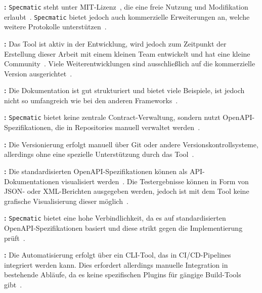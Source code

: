 \textbf{:} \texttt{Specmatic} steht unter \gls{MIT}-Lizenz~\cite{ZnsioSpecmatic2025}, die eine freie Nutzung und Modifikation erlaubt~\cite{MITLicense}.
\texttt{Specmatic} bietet jedoch auch kommerzielle Erweiterungen an, welche \zB weitere Protokolle unterstützen~\cite{ContractDrivenDevelopment}.

\textbf{:} Das Tool ist aktiv in der Entwicklung, wird jedoch zum Zeitpunkt der Erstellung dieser Arbeit mit einem kleinen Team entwickelt und hat eine kleine Community~\cite{ZnsioSpecmatic2025}.
Viele Weiterentwicklungen sind ausschließlich auf die kommerzielle Version ausgerichtet~\cite{ContractDrivenDevelopment}.

\textbf{:} Die Dokumentation ist gut strukturiert und bietet viele Beispiele, ist jedoch nicht so umfangreich wie bei den anderen Frameworks~\cite{SpecmaticDocumentationContract}.

\textbf{:} \texttt{Specmatic} bietet keine zentrale Contract-Verwaltung, sondern nutzt \gls{OpenAPI}-Spezifikationen, die in Repositories manuell verwaltet werden~\cite{ContractDrivenDevelopment}.

\textbf{:} Die Versionierung erfolgt manuell über Git oder andere Versionskontrollsysteme, allerdings ohne eine spezielle Unterstützung durch das Tool~\cite{SpecmaticDocumentationContract}.

\textbf{:} Die standardisierten \gls{OpenAPI}-Spezifikationen können als \gls{API}-Dokumentationen visualisiert werden~\cite{OpenAPIDocumentation}.
Die Testergebnisse können in Form von \gls{JSON}- oder \gls{XML}-Berichten ausgegeben werden, jedoch ist mit dem Tool keine grafische Visualisierung dieser möglich~\cite{SpecmaticDocumentationContract}.

\textbf{:} \texttt{Specmatic} bietet eine hohe Verbindlichkeit, da es auf standardisierten \gls{OpenAPI}-Spezifikationen basiert und diese strikt gegen die Implementierung prüft~\cite{SpecmaticDocumentationContract}.

\textbf{:} Die Automatisierung erfolgt über ein \gls{CLI}-Tool, das in \gls{CI}/\gls{CD}-\glspl{Pipeline} integriert werden kann.
Dies erfordert allerdings manuelle Integration in bestehende Abläufe, da es keine spezifischen Plugins für gängige \gls{Build}-Tools gibt~\cite{SpecmaticDocumentationContract}.

